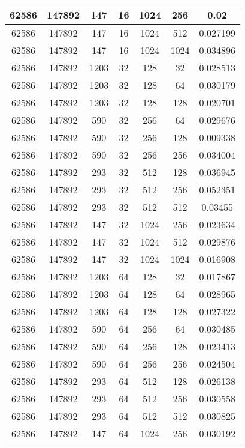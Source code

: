 \documentclass[9pt]{article}
\begin{document}
\begin{tabular}{|c|c|c|c|c|c|c| }
\hline
62586  & 147892  & 147  & 16  & 1024  & 256  & 0.02 \\
\hline
62586  & 147892  & 147  & 16  & 1024  & 512  & 0.027199 \\
\hline
62586  & 147892  & 147  & 16  & 1024  & 1024  & 0.034896 \\
\hline
62586  & 147892  & 1203  & 32  & 128  & 32  & 0.028513 \\
\hline
62586  & 147892  & 1203  & 32  & 128  & 64  & 0.030179 \\
\hline
62586  & 147892  & 1203  & 32  & 128  & 128  & 0.020701 \\
\hline
62586  & 147892  & 590  & 32  & 256  & 64  & 0.029676 \\
\hline
62586  & 147892  & 590  & 32  & 256  & 128  & 0.009338 \\
\hline
62586  & 147892  & 590  & 32  & 256  & 256  & 0.034004 \\
\hline
62586  & 147892  & 293  & 32  & 512  & 128  & 0.036945 \\
\hline
62586  & 147892  & 293  & 32  & 512  & 256  & 0.052351 \\
\hline
62586  & 147892  & 293  & 32  & 512  & 512  & 0.03455 \\
\hline
62586  & 147892  & 147  & 32  & 1024  & 256  & 0.023634 \\
\hline
62586  & 147892  & 147  & 32  & 1024  & 512  & 0.029876 \\
\hline
62586  & 147892  & 147  & 32  & 1024  & 1024  & 0.016908 \\
\hline
62586  & 147892  & 1203  & 64  & 128  & 32  & 0.017867 \\
\hline
62586  & 147892  & 1203  & 64  & 128  & 64  & 0.028965 \\
\hline
62586  & 147892  & 1203  & 64  & 128  & 128  & 0.027322 \\
\hline
62586  & 147892  & 590  & 64  & 256  & 64  & 0.030485 \\
\hline
62586  & 147892  & 590  & 64  & 256  & 128  & 0.023413 \\
\hline
62586  & 147892  & 590  & 64  & 256  & 256  & 0.024504 \\
\hline
62586  & 147892  & 293  & 64  & 512  & 128  & 0.026138 \\
\hline
62586  & 147892  & 293  & 64  & 512  & 256  & 0.030558 \\
\hline
62586  & 147892  & 293  & 64  & 512  & 512  & 0.030825 \\
\hline
62586  & 147892  & 147  & 64  & 1024  & 256  & 0.030192 \\

\end{tabular}
\end{document}
